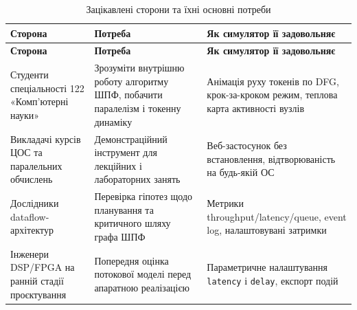 \documentclass[
]{article}
\begin{document}
\begin{longtable}[]{@{}
  >{\raggedright\arraybackslash}p{}
  >{\raggedright\arraybackslash}p{}
  >{\raggedright\arraybackslash}p{}@{}}
\caption[Зацікавлені сторони та їхні основні потреби]{Зацікавлені
сторони та їхні основні потреби}\tabularnewline
\toprule\noalign{}
\begin{minipage}[b]{\linewidth}\raggedright
\textbf{Сторона}
\end{minipage} & \begin{minipage}[b]{\linewidth}\raggedright
\textbf{Потреба}
\end{minipage} & \begin{minipage}[b]{\linewidth}\raggedright
\textbf{Як симулятор її задовольняє}
\end{minipage} \\
\midrule\noalign{}
\endfirsthead
\toprule\noalign{}
\begin{minipage}[b]{\linewidth}\raggedright
\textbf{Сторона}
\end{minipage} & \begin{minipage}[b]{\linewidth}\raggedright
\textbf{Потреба}
\end{minipage} & \begin{minipage}[b]{\linewidth}\raggedright
\textbf{Як симулятор її задовольняє}
\end{minipage} \\
\midrule\noalign{}
\endhead
\bottomrule\noalign{}
\endlastfoot
Студенти спеціальності 122 «Комп'ютерні науки» & Зрозуміти внутрішню
роботу алгоритму ШПФ, побачити паралелізм і токенну динаміку & Анімація
руху токенів по DFG, крок-за-кроком режим, теплова карта активності
вузлів \\
Викладачі курсів ЦОС та паралельних обчислень & Демонстраційний
інструмент для лекційних і лабораторних занять & Веб-застосунок без
встановлення, відтворюваність на будь-якій ОС \\
Дослідники dataflow-архітектур & Перевірка гіпотез щодо планування та
критичного шляху графа ШПФ & Метрики throughput/latency/queue, event
log, налаштовувані затримки \\
Інженери DSP/FPGA на ранній стадії проєктування & Попередня оцінка
потокової моделі перед апаратною реалізацією & Параметричне налаштування
\texttt{latency} і \texttt{delay}, експорт подій \\
\end{longtable}
\end{document}
